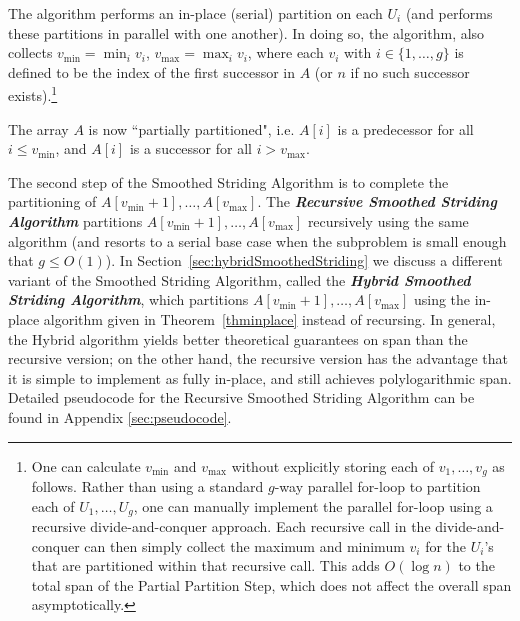 \documentclass[11pt]{article}
\newcommand{\defn}[1]{{\textit{\textbf{\boldmath #1}}}}
\theoremstyle{remark}
\theoremstyle{remark}
\begin{document}
The algorithm performs an in-place (serial) partition on each
$U_i$ (and performs these partitions in parallel with one
another). In doing so, the algorithm, also collects
$v_{\text{min}}=\min_i{v_i}$, $v_{\text{max}}=\max_i{v_i}$, where
each $v_i$ with $i \in \{1, \ldots, g\}$ is defined to be the index
of the first successor in $A$ (or $n$ if no such successor
exists).\footnote{One can calculate $v_{\text{min}}$ and
  $v_{\text{max}}$ without explicitly storing each of $v_1, \ldots,
  v_{g}$ as follows. Rather than using a standard $g$-way parallel
  for-loop to partition each of $U_1, \ldots, U_{g}$, one can
  manually implement the parallel for-loop using a recursive
  divide-and-conquer approach. Each recursive call in the
  divide-and-conquer can then simply collect the maximum and minimum
  $v_i$ for the $U_i$'s that are partitioned within that recursive
  call. This adds $O(\log n)$ to the total span of the Partial
  Partition Step, which does not affect the overall span
  asymptotically.
}

The array $A$ is now ``partially partitioned", i.e. $A[i]$ is a
predecessor for all $i \le v_{\text{min}}$, and $A[i]$ is a successor
for all $i > v_{\text{max}}$.

The second step of the Smoothed Striding Algorithm is to complete
the partitioning of $A[v_{\text{min}} + 1], \ldots,
A[v_{\text{max}}]$. The \defn{Recursive Smoothed Striding
Algorithm} partitions $A[v_{\text{min}} + 1], \ldots,
A[v_{\text{max}}]$ recursively using the same algorithm (and
resorts to a serial base case when the subproblem is small enough
that $g \le O(1)$). In Section~\ref{sec:hybridSmoothedStriding}
we discuss a different variant of the Smoothed Striding
Algorithm, called the \defn{Hybrid Smoothed Striding Algorithm},
which partitions $A[v_{\text{min}} + 1], \ldots,
A[v_{\text{max}}]$ using the in-place algorithm given in
Theorem~\ref{thminplace} instead of recursing. In general, the
Hybrid algorithm yields better theoretical guarantees on span
than the recursive version; on the other hand, the recursive
version has the advantage that it is simple to implement as fully
in-place, and still achieves polylogarithmic span. Detailed
pseudocode for the Recursive Smoothed Striding Algorithm can be
found in Appendix \ref{sec:pseudocode}. 

\end{document}
